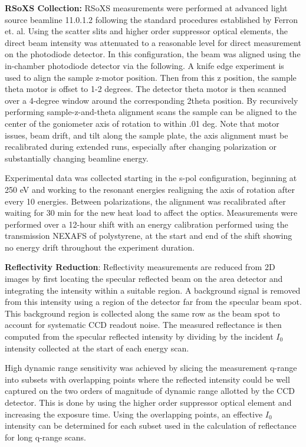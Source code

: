 \textbf{RSoXS Collection:} RSoXS measurements were performed at advanced light source beamline 11.0.1.2 following the standard procedures established by Ferron et. al. Using the scatter slits and higher order suppressor optical elements, the direct beam intensity was attenuated to a reasonable level for direct measurement on the photodiode detector. In this configuration, the beam was aligned using the in-chamber photodiode detector via the following. A knife edge experiment is used to align the sample z-motor position. Then from this z position, the sample theta motor is offset to 1-2 degrees. The detector theta motor is then scanned over a 4-degree window around the corresponding 2theta position. By recursively performing sample-z-and-theta alignment scans the sample can be aligned to the center of the goniometer axis of rotation to within .01 deg. Note that motor issues, beam drift, and tilt along the sample plate, the axis alignment must be recalibrated during extended runs, especially after changing polarization or substantially changing beamline energy.

Experimental data was collected starting in the s-pol configuration, beginning at 250 eV and working to the resonant energies realigning the axis of rotation after every 10 energies. Between polarizations, the alignment was recalibrated after waiting for 30 min for the new heat load to affect the optics. Measurements were performed over a 12-hour shift with an energy calibration performed using the transmission NEXAFS of polystyrene, at the start and end of the shift showing no energy drift throughout the experiment duration.

\textbf{Reflectivity Reduction}: Reflectivity measurements are reduced from 2D images by first locating the specular reflected beam on the area detector and integrating the intensity within a suitable region. A background signal is removed from this intensity using a region of the detector far from the specular beam spot. This background region is collected along the same row as the beam spot to account for systematic CCD readout noise. The measured reflectance is then computed from the specular reflected intensity by dividing by the incident \(I_{0}\) intensity collected at the start of each energy scan.

High dynamic range sensitivity was achieved by slicing the measurement q-range into subsets with overlapping points where the reflected intensity could be well captured on the two orders of magnitude of dynamic range allotted by the CCD detector. This is done by using the higher order suppressor optical element and increasing the exposure time. Using the overlapping points, an effective \(I_{0}\) intensity can be determined for each subset used in the calculation of reflectance for long q-range scans.


